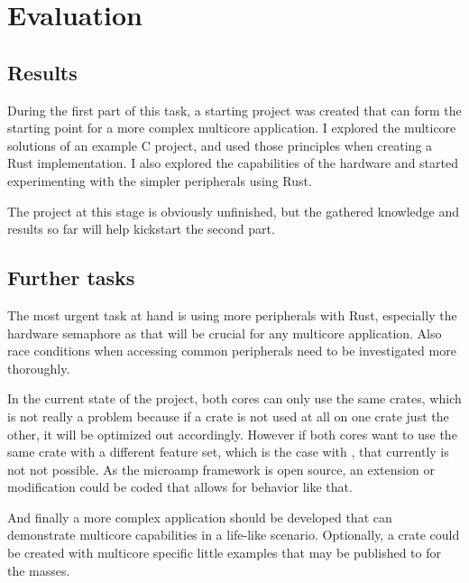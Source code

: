 \chapter{Evaluation}

\section{Results}

During the first part of this task, a starting project was created that can form the starting point for a more complex multicore application. I explored the multicore solutions of an example C project, and used those principles when creating a Rust implementation. I also explored the capabilities of the hardware and started experimenting with the simpler peripherals using Rust.

The project at this stage is obviously unfinished, but the gathered knowledge and results so far will help kickstart the second part.

\section{Further tasks}

The most urgent task at hand is using more peripherals with Rust, especially the hardware semaphore as that will be crucial for any multicore application. Also race conditions when accessing common peripherals need to be investigated more thoroughly.

In the current state of the project, both cores can only use the same crates, which is not really a problem because if a crate is not used at all on one crate just the other, it will be optimized out accordingly. However if both cores want to use the same crate with a different feature set, which is the case with , that currently is not not possible. As the microamp framework is open source, an extension or modification could be coded that allows for behavior like that.

And finally a more complex application should be developed that can demonstrate multicore capabilities in a life-like scenario. Optionally, a crate could be created with multicore specific little examples that may be published to  for the masses.
